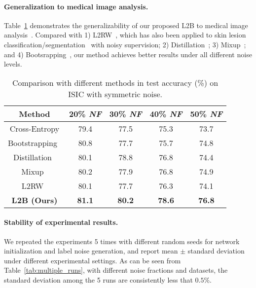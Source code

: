 \documentclass{article}
\begin{document}
\paragraph{Generalization to medical image analysis.} Table~\ref{tab:ISIC} demonstrates the generalizability of our proposed L2B to medical image analysis~\cite{xue2019robust}. Compared with 1) L2RW~\cite{ren2018learning}, which has also been applied to skin lesion classification/segmentation~\cite{xue2019robust,mirikharaji2019learning} with noisy supervision; 2) Distillation~\cite{li2017learning}; 3)
Mixup~\cite{zhang2018mixup}; and 4) Bootsrapping~\cite{reed2014training}, our method achieves better results under all different noise levels.

\begin{table}[h!]
\footnotesize
\centering
\caption{Comparison with different methods in test accuracy (\%) on ISIC
with symmetric noise.}
\vspace{-1em}
\label{tab:ISIC}
\vspace{1ex}
\begin{tabular}{|c|c|c|c|c|}
\hline
Method  &20\% \emph{NF} &30\% \emph{NF} &40\% \emph{NF}  &50\% \emph{NF}  \\
 \hline
Cross-Entropy   &79.4 &77.5 &75.3 &73.7   \\
Bootstrapping~\cite{reed2014training}  &80.8 &77.7 &75.7  &74.8  \\
Distillation~\cite{li2017learning}  &80.1 &78.8 &76.8  &74.4  \\
Mixup~\cite{zhang2018mixup}  &80.2 &77.9 &76.8   &74.9 \\
L2RW~\cite{ren2018learning}  &80.1  &77.7 &76.3  &74.1   \\
\hline
\textbf{L2B (Ours)}  &\textbf{81.1} &\textbf{80.2} &\textbf{78.6} &\textbf{76.8}   \\
\hline
\end{tabular}
\end{table} 


 

   



    
\paragraph{Stability of experimental results.}
We repeated the experiments 5 times with different random seeds for network initialization and label noise generation, and report mean $\pm$ standard deviation under different experimental settings. As can be seen from Table~\ref{tab:multiple_runs}, with different noise fractions and datasets, the standard deviation among the 5 runs are consistently less that $0.5\%$.
\end{document}

